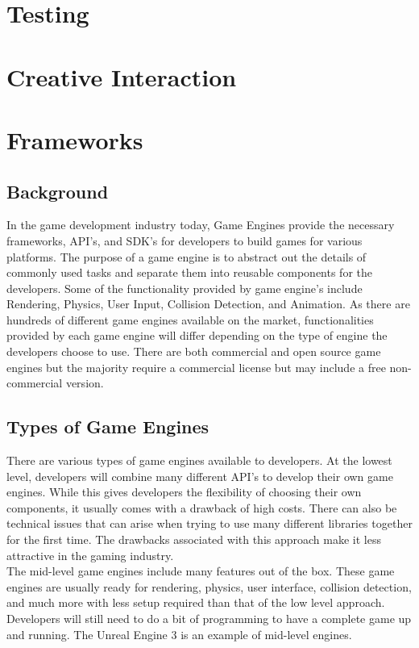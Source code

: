 \section{Testing}

\section{Creative Interaction}

\section{Frameworks}

\subsection{Background}
In the game development industry today, Game Engines provide the necessary frameworks, API's, and SDK's for developers to build games for various platforms. The purpose of a game engine is to abstract out the details of commonly used tasks and separate them into reusable components for the developers. Some of the functionality provided by game engine's include Rendering, Physics, User Input, Collision Detection, and Animation. As there are hundreds of different game engines available on the market, functionalities provided by each game engine will differ depending on the type of engine the developers choose to use. There are both commercial and open source game engines but the majority require a commercial license but may include a free non-commercial version.

\subsection{Types of Game Engines}
There are various types of game engines available to developers. At the lowest level, developers will combine many different API's to develop their own game engines. While this gives developers the flexibility of choosing their own components, it usually comes with a drawback of high costs. There can also be technical issues that can arise when trying to use many different libraries together for the first time. The drawbacks associated with this approach make it less attractive in the gaming industry.\\

The mid-level game engines include many features out of the box. These game engines are usually ready for rendering, physics, user interface, collision detection, and much more with less setup required than that of the low level approach. Developers will still need to do a bit of programming to have a complete game up and running. The Unreal Engine 3 is an example of mid-level engines.\\


